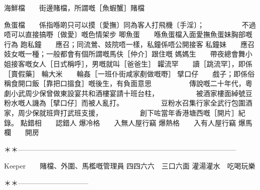 海鮮檔　　街邊賭檔，所謂嘅［魚蝦蟹］賭檔

魚蛋檔　　係指喺啲只可以摸〔愛撫〕同為客人打飛機〔手淫〕；  
　　　　　不過唔可以直接搞嘢〔做愛〕嘅色情架步  
唧魚蛋　　喺魚蛋檔入面愛撫魚蛋妹胸部嘅行為  
跑私鐘　　應召；同流鶯、妓院唔一樣，私鐘係唔公開接客  
私鐘妹　　應召妓女嘅一種；一般都會有個所謂嘅馬伕［仲介］跟住嘅  
媽媽生　　帶夜總會舞小姐接客嘅女人［日式稱呼］，男嘅就叫［爸爸生］  
糶流罕　　讀［跳流罕］，即係［賣假藥］  
輪大米　　輪姦［一班仆街咸家剷做嘅嘢］  
擘口仔　　戲子；即係俗稱食開口飯［靠把口搵食］嘅後生，有負面意思  
　　　　　傳說嘅二十年代，粵劇小武周少保曾做東設宴共和酒樓宴請十班台柱，  
　　　　　被酒家樓面綽號豆粉水嘅人譏為［擘口仔］而被人亂打。  
　　　　　豆粉水召集行家全武行包圍酒家，周少保就班齊打武班支援，  
　　　　　創下咗當年香港塘西嘅［開片］紀錄。  
點錯相　　認錯人  
爆冷格　　入無人屋行竊  
爆熱格　　入有人屋行竊  
爆馬欄　　開房  
  
＊＊———————————————————————————————  
  
Keeper　　賭檔、外圍、馬檻嘅管理員  
四四六六　三口六面  
灌湯灌水　吃喝玩樂  
  
＊＊——————————